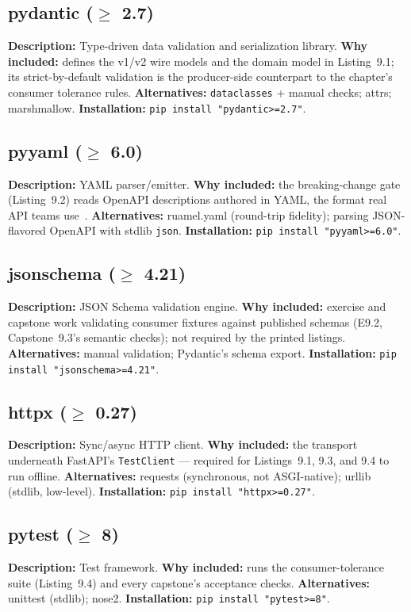 \subsection{pydantic ($\geq$ 2.7)}
\textbf{Description:} Type-driven data validation and serialization library.
\textbf{Why included:} defines the v1/v2 wire models and the domain model in
Listing~9.1; its strict-by-default validation is the producer-side
counterpart to the chapter's consumer tolerance rules. \textbf{Alternatives:}
\texttt{dataclasses} + manual checks; attrs; marshmallow.
\textbf{Installation:} \texttt{pip install "pydantic>=2.7"}.

\subsection{pyyaml ($\geq$ 6.0)}
\textbf{Description:} YAML parser/emitter. \textbf{Why included:} the
breaking-change gate (Listing~9.2) reads OpenAPI descriptions authored in
YAML, the format real API teams use~\cite{openapi31}. \textbf{Alternatives:}
ruamel.yaml (round-trip fidelity); parsing JSON-flavored OpenAPI with stdlib
\texttt{json}. \textbf{Installation:} \texttt{pip install "pyyaml>=6.0"}.

\subsection{jsonschema ($\geq$ 4.21)}
\textbf{Description:} JSON Schema validation engine. \textbf{Why included:}
exercise and capstone work validating consumer fixtures against published
schemas (E9.2, Capstone~9.3's semantic checks); not required by the printed
listings. \textbf{Alternatives:} manual validation; Pydantic's schema export.
\textbf{Installation:} \texttt{pip install "jsonschema>=4.21"}.

\subsection{httpx ($\geq$ 0.27)}
\textbf{Description:} Sync/async HTTP client. \textbf{Why included:} the
transport underneath FastAPI's \texttt{TestClient} --- required for
Listings~9.1, 9.3, and 9.4 to run offline. \textbf{Alternatives:} requests
(synchronous, not ASGI-native); urllib (stdlib, low-level).
\textbf{Installation:} \texttt{pip install "httpx>=0.27"}.

\subsection{pytest ($\geq$ 8)}
\textbf{Description:} Test framework. \textbf{Why included:} runs the
consumer-tolerance suite (Listing~9.4) and every capstone's acceptance
checks. \textbf{Alternatives:} unittest (stdlib); nose2.
\textbf{Installation:} \texttt{pip install "pytest>=8"}.

